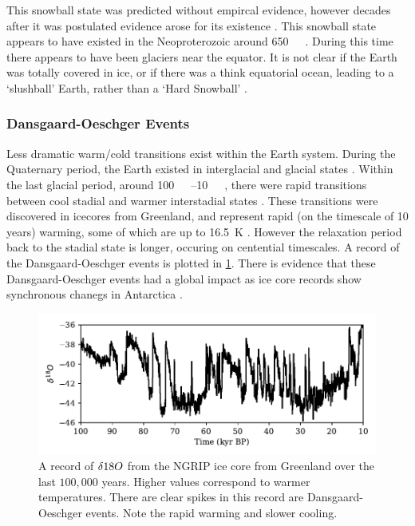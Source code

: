 This snowball state was predicted without empircal evidence, however decades after it was postulated evidence arose for its existence \parencite{Kirshvink1992,Hoffman2002}.
This snowball state appears to have existed in the Neoproterozoic around \SI{650}{\mega\year\beforepresent}.
During this time there appears to have been glaciers near the equator. It is not clear
if the Earth was totally covered in ice, or if there was a think equatorial ocean, leading to a `slushball' Earth, rather than a `Hard Snowball' \parencite{Pierrehumbert2005,Pierrehumbert2011}.

\subsubsection{Dansgaard-Oeschger Events}
Less dramatic warm/cold transitions exist within the Earth system. During the Quaternary period, the Earth existed in interglacial and glacial states \parencite{Lisiecki2005}. Within the last glacial period,
around \SIrange{100}{10}{\kilo\year\beforepresent}, there were rapid transitions between cool stadial and warmer interstadial states \parencite{Oeschger1984,Dansgaard1993}. These transitions were discovered
in icecores from Greenland, and represent rapid (on the timescale of 10 years) warming, some of which are up to \SI{16.5}{\kelvin} \parencite{Kindler2014}. However the relaxation period
back to the stadial state is longer, occuring on centential timescales. A record of the Dansgaard-Oeschger events is plotted in \cref{fig:ngrip}. There is evidence that these Dansgaard-Oeschger events
had a global impact as ice core records show synchronous chanegs in Antarctica \parencite{Buizert2015}.

\begin{figure}
  \centering
  \includegraphics{ngrip}
  \caption[NGRIP record of Dansgaard Oeschger events]{A record of $\delta \ce{18}O$ from the NGRIP ice core from Greenland \parencite{NGRIP2004} over the last $100,000$ years.
    Higher values correspond to warmer temperatures. There are clear spikes in this record are Dansgaard-Oeschger events. Note the rapid warming and slower cooling.}
  \label{fig:ngrip}
\end{figure}

